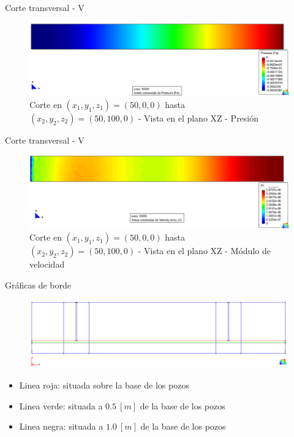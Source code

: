 \documentclass[spanish]{beamer}
\begin{document}
%
\begin{frame}{Corte transversal - V}
\begin{center}
\begin{figure}[htbp]
\centerline{\includegraphics[scale=0.25]{../img/200m/resul/200_XZ_presion_corte_horizontal}}
\caption{Corte en $(x_1,y_1,z_1)=(50,0,0)$ hasta $(x_2,y_2,z_2)=(50,100,0)$ - Vista en el plano XZ - Presión}
\end{figure}
\end{center}
\end{frame}
%
\begin{frame}{Corte transversal - V}
\begin{center}
\begin{figure}[htbp]
\centerline{\includegraphics[scale=0.25]{../img/200m/resul/200_XZ_velocidad_corte_horizontal}}
\caption{Corte en $(x_1,y_1,z_1)=(50,0,0)$ hasta $(x_2,y_2,z_2)=(50,100,0)$ - Vista en el plano XZ - Módulo de velocidad}
\end{figure}
\end{center}
\end{frame}
%
\begin{frame}{Gráficas de borde}
\begin{center}
\begin{figure}[htbp]
\centerline{\includegraphics[scale=0.25]{../img/200m/perfiles}}
\end{figure}
\end{center}
\begin{itemize}
\item \color{red} Linea roja: situada sobre la base de los pozos
\item \color{green} Linea verde: situada a $0.5~[m]$ de la base de los pozos
\item \color{black} Linea negra: situada a $1.0~[m]$ de la base de los pozos
\end{itemize}
\end{frame}
\end{document}
